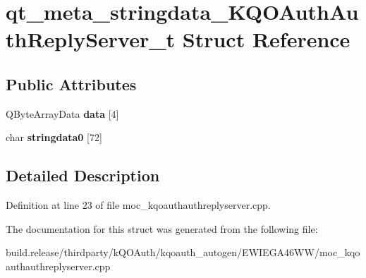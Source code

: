 \hypertarget{structqt__meta__stringdata___k_q_o_auth_auth_reply_server__t}{}\section{qt\+\_\+meta\+\_\+stringdata\+\_\+\+K\+Q\+O\+Auth\+Auth\+Reply\+Server\+\_\+t Struct Reference}
\label{structqt__meta__stringdata___k_q_o_auth_auth_reply_server__t}
\subsection*{Public Attributes}
\begin{DoxyCompactItemize}
\item 
\mbox{\label{structqt__meta__stringdata___k_q_o_auth_auth_reply_server__t_af294ecf2979616f92b1487056b7036eb}} 
Q\+Byte\+Array\+Data {\bfseries data} \mbox{[}4\mbox{]}
\item 
\mbox{\label{structqt__meta__stringdata___k_q_o_auth_auth_reply_server__t_ada62692325c7c142d2f19b2722f6c0fe}} 
char {\bfseries stringdata0} \mbox{[}72\mbox{]}
\end{DoxyCompactItemize}


\subsection{Detailed Description}


Definition at line 23 of file moc\+\_\+kqoauthauthreplyserver.\+cpp.



The documentation for this struct was generated from the following file\+:\begin{DoxyCompactItemize}
\item 
build.\+release/thirdparty/k\+Q\+O\+Auth/kqoauth\+\_\+autogen/\+E\+W\+I\+E\+G\+A46\+W\+W/moc\+\_\+kqoauthauthreplyserver.\+cpp\end{DoxyCompactItemize}
